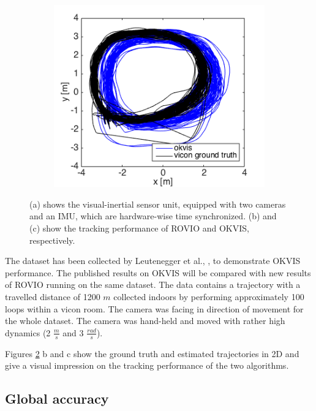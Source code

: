 \begin{figure}
  \begin{subfigure}[b]{0.34\textwidth}
    \includegraphics[width=\textwidth]{images/ijrr/2D_okvis.png}
    \caption{}
    \label{fig:2}
  \end{subfigure}
   \caption{(a) shows the visual-inertial sensor unit, equipped with two cameras and an IMU, which are hardware-wise time synchronized. (b) and (c) show the tracking performance of ROVIO and OKVIS, respectively.}
   \label{pics:visensor}
\end{figure}

The dataset has been collected by Leutenegger et al., \cite{leutenegger2015keyframe}, to demonstrate OKVIS performance. The published results on OKVIS will be compared with new results of ROVIO running on the same dataset. The data contains a trajectory with a travelled distance of 1200 $m$ collected indoors by performing approximately 100 loops within a vicon room. The camera was facing in direction of movement for the whole dataset. The camera was hand-held and moved with rather high dynamics (2 $\frac{m}{s}$ and 3 $\frac{rad}{s}$).

Figures \ref{pics:visensor} b and c show the ground truth and estimated trajectories in 2D and give a visual impression on the tracking performance of the two algorithms.

\subsection{Global accuracy}
\label{sec:ijrr_global}

